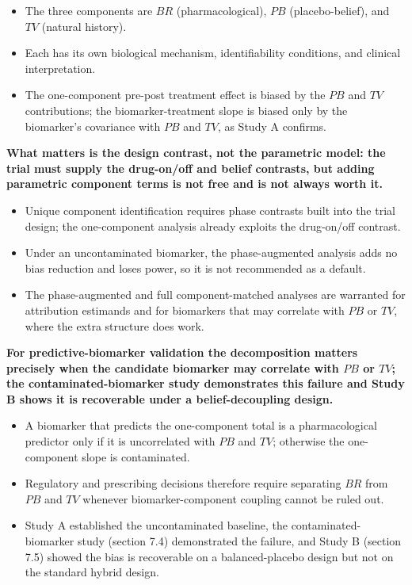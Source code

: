 \documentclass[
  11pt,
]{article}
\begin{document}
\begin{itemize}\setlength{\itemsep}{2pt}\setlength{\parskip}{0pt}
\item The three components are $BR$ (pharmacological), $PB$ (placebo-belief), and $TV$ (natural history).
\item Each has its own biological mechanism, identifiability conditions, and clinical interpretation.
\item The one-component pre-post treatment effect is biased by the $PB$ and $TV$ contributions; the biomarker-treatment slope is biased only by the biomarker's covariance with $PB$ and $TV$, as Study A confirms.
\end{itemize}

\textbf{What matters is the design contrast, not the parametric model: the trial must supply the drug-on/off and belief contrasts, but adding parametric component terms is not free and is not always worth it.}

\begin{itemize}\setlength{\itemsep}{2pt}\setlength{\parskip}{0pt}
\item Unique component identification requires phase contrasts built into the trial design; the one-component analysis already exploits the drug-on/off contrast.
\item Under an uncontaminated biomarker, the phase-augmented analysis adds no bias reduction and loses power, so it is not recommended as a default.
\item The phase-augmented and full component-matched analyses are warranted for attribution estimands and for biomarkers that may correlate with $PB$ or $TV$, where the extra structure does work.
\end{itemize}

\textbf{For predictive-biomarker validation the decomposition matters precisely when the candidate biomarker may correlate with $PB$ or $TV$; the contaminated-biomarker study demonstrates this failure and Study B shows it is recoverable under a belief-decoupling design.}

\begin{itemize}\setlength{\itemsep}{2pt}\setlength{\parskip}{0pt}
\item A biomarker that predicts the one-component total is a pharmacological predictor only if it is uncorrelated with $PB$ and $TV$; otherwise the one-component slope is contaminated.
\item Regulatory and prescribing decisions therefore require separating $BR$ from $PB$ and $TV$ whenever biomarker-component coupling cannot be ruled out.
\item Study A established the uncontaminated baseline, the contaminated-biomarker study (section 7.4) demonstrated the failure, and Study B (section 7.5) showed the bias is recoverable on a balanced-placebo design but not on the standard hybrid design.
\end{itemize}
\end{document}
